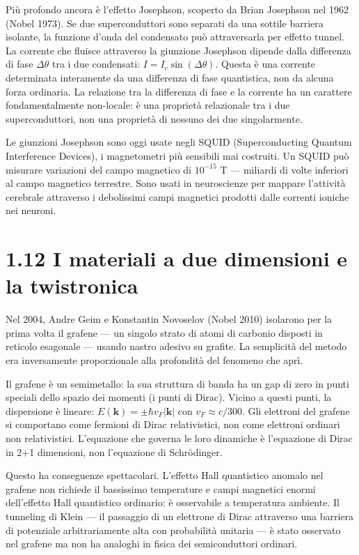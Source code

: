 \documentclass[11.5pt,a4paper,openany]{book}
\theoremstyle{remark}
\begin{document}
Più profondo ancora è l'effetto Josephson, scoperto da Brian Josephson nel 1962 (Nobel 1973). Se due superconduttori sono separati da una sottile barriera isolante, la funzione d'onda del condensato può attraversarla per effetto tunnel. La corrente che fluisce attraverso la giunzione Josephson dipende dalla differenza di fase $\Delta\theta$ tra i due condensati: $I = I_c \sin(\Delta\theta)$. Questa è una corrente determinata interamente da una differenza di fase quantistica, non da alcuna forza ordinaria. La relazione tra la differenza di fase e la corrente ha un carattere fondamentalmente non-locale: è una proprietà relazionale tra i due superconduttori, non una proprietà di nessuno dei due singolarmente.

Le giunzioni Josephson sono oggi usate negli SQUID (Superconducting Quantum Interference Devices), i magnetometri più sensibili mai costruiti. Un SQUID può misurare variazioni del campo magnetico di $10^{-15}$ T --- miliardi di volte inferiori al campo magnetico terrestre. Sono usati in neuroscienze per mappare l'attività cerebrale attraverso i debolissimi campi magnetici prodotti dalle correnti ioniche nei neuroni.

\section{1.12 I materiali a due dimensioni e la twistronica}

Nel 2004, Andre Geim e Konstantin Novoselov (Nobel 2010) isolarono per la prima volta il grafene --- un singolo strato di atomi di carbonio disposti in reticolo esagonale --- usando nastro adesivo su grafite. La semplicità del metodo era inversamente proporzionale alla profondità del fenomeno che aprì.

Il grafene è un semimetallo: la sua struttura di banda ha un gap di zero in punti speciali dello spazio dei momenti (i punti di Dirac). Vicino a questi punti, la dispersione è lineare: $E(\mathbf{k}) = \pm\hbar v_F|\mathbf{k}|$ con $v_F \approx c/300$. Gli elettroni del grafene si comportano come fermioni di Dirac relativistici, non come elettroni ordinari non relativistici. L'equazione che governa le loro dinamiche è l'equazione di Dirac in 2+1 dimensioni, non l'equazione di Schrödinger.

Questo ha conseguenze spettacolari. L'effetto Hall quantistico anomalo nel grafene non richiede il bassissimo temperature e campi magnetici enormi dell'effetto Hall quantistico ordinario: è osservabile a temperatura ambiente. Il tunneling di Klein --- il passaggio di un elettrone di Dirac attraverso una barriera di potenziale arbitrariamente alta con probabilità unitaria --- è stato osservato nel grafene ma non ha analoghi in fisica dei semiconduttori ordinari.
\end{document}
